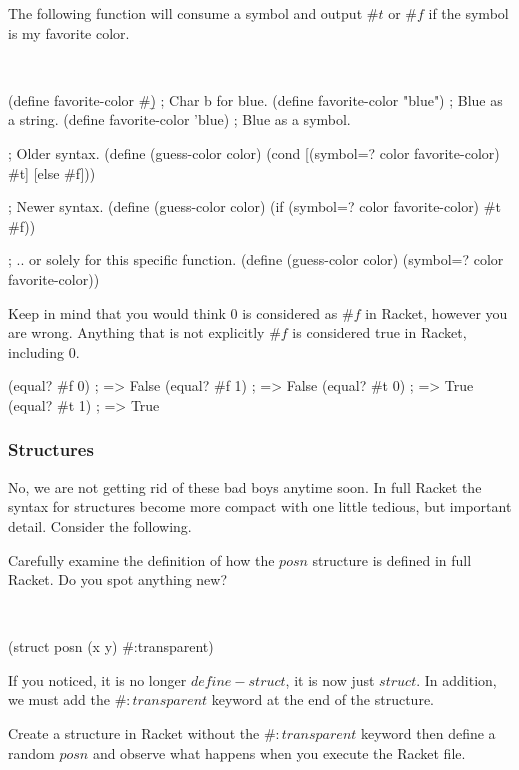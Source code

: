 \documentclass[11pt, twoside, exarticle]{article}
\newcommand{\exbox}[2] {
	\setlength{\fboxsep}{8pt}
	\marginpar {
		\vspace{0.9em}
		\footnotesize{\textbf{\color{darkpurple}EXAMPLE #1}}
	}
	\colorbox{lightpurple}{
		\begin{varwidth}{\dimexpr\linewidth-2\fboxsep}
		#2
		\end{varwidth}
	}
	~\\
}
\newcommand{\exerbox}[1] {
	\setlength{\fboxsep}{8pt}
	\marginpar {
		\vspace{0.9em}
		\footnotesize{\textbf{\color{darkred}EXERCISE}}
	}
	\colorbox{lightred}{
		\begin{varwidth}{\dimexpr\linewidth-2\fboxsep}
		#1
		\end{varwidth}
	}
	~\\
}
\begin{document}
\clearpage
\exbox{5}{The following function will consume a symbol and output $\#t$ or $\#f$ if the symbol is my favorite color.}

\begin{code}[Lisp]
(define favorite-color #\b) ; Char b for blue.
(define favorite-color "blue") ; Blue as a string.
(define favorite-color 'blue) ; Blue as a symbol.

; Older syntax.
(define (guess-color color)
	(cond
		[(symbol=? color favorite-color) #t]
		[else #f]))

; Newer syntax.
(define (guess-color color)
	(if (symbol=? color favorite-color) #t #f))

; .. or solely for this specific function.
(define (guess-color color)
	(symbol=? color favorite-color))
\end{code}

Keep in mind that you would think 0 is considered as $\#f$ in Racket, however you are wrong. Anything that is not explicitly $\#f$ is considered true in Racket, including 0.\\

\begin{code}[Lisp]
(equal? #f 0) ; => False
(equal? #f 1) ; => False
(equal? #t 0) ; => True
(equal? #t 1) ; => True
\end{code}

\subsubsection*{Structures}

No, we are not getting rid of these bad boys anytime soon. In full Racket the syntax for structures become more compact with one little tedious, but important detail. Consider the following.\\

\exbox{6}{Carefully examine the definition of how the $posn$ structure is defined in full Racket. Do you spot anything new?}

\begin{code}[Lisp]
(struct posn (x y) #:transparent)
\end{code}

If you noticed, it is no longer $define-struct$, it is now just $struct$. In addition, we must add the $\#:transparent$ keyword at the end of the structure.\\

\clearpage
\exerbox{Create a structure in Racket without the $\#:transparent$ keyword then define a random $posn$ and observe what happens when you execute the Racket file.}
\end{document}
